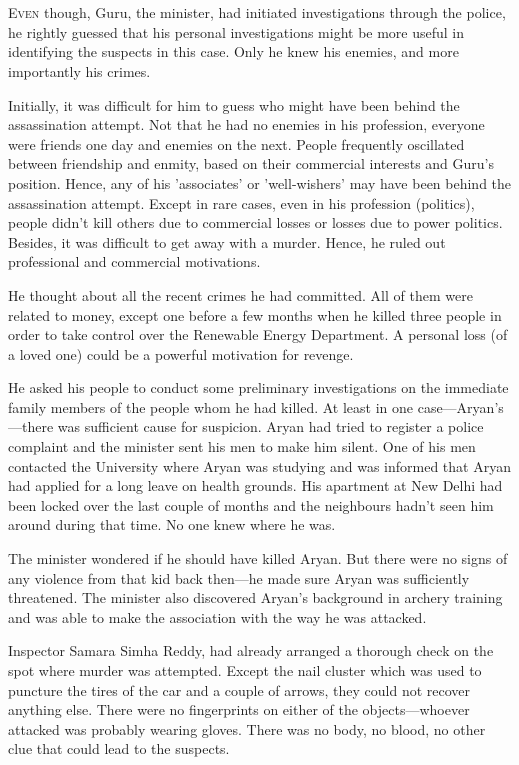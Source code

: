 \chapter{}

\lettrine{E}{ven} though, Guru, the minister, had initiated investigations through the
police, he rightly guessed that his personal investigations might be more useful
in identifying the suspects in this case. Only he knew his enemies, and more
importantly his crimes.

Initially, it was difficult for him to guess who might have been behind the
assassination attempt. Not that he had no enemies in his profession, everyone
were friends one day and enemies on the next. People frequently oscillated
between friendship and enmity, based on their commercial interests and Guru's
position. Hence, any of his 'associates' or 'well-wishers' may have been behind
the assassination attempt. Except in rare cases, even in his profession
(politics), people didn't kill others due to commercial losses or losses due to
power politics. Besides, it was difficult to get away with a murder. Hence, he
ruled out professional and commercial motivations.

He thought about all the recent crimes he had committed. All of them were
related to money, except one before a few months when he killed three people in
order to take control over the Renewable Energy Department. A personal loss (of
a loved one) could be a powerful motivation for revenge.

He asked his people to conduct some preliminary investigations on the immediate
family members of the people whom he had killed. At least in one
case—Aryan's—there was sufficient cause for suspicion. Aryan had tried to register
a police
complaint and the minister sent his men to make him silent. One of his men
contacted the University where Aryan was studying and was informed that Aryan
had applied for a long leave on health grounds. His apartment at New Delhi had
been locked over the last couple of months and the neighbours hadn't seen him
around during that time. No one knew where he was.

The minister wondered if he should have killed Aryan. But there were no signs of
any violence from that kid back then—he made sure Aryan was sufficiently
threatened. The minister also discovered Aryan's background in archery training
and was able to make the association with the way he was attacked.

Inspector Samara Simha Reddy, had already arranged a thorough check on the
spot where murder was attempted. Except the nail cluster which was used to
puncture the tires of the car and a couple of arrows, they could not recover
anything else. There were no fingerprints on either of the objects—whoever
attacked was probably wearing gloves. There was no body, no blood, no other clue
that could lead to the suspects.


